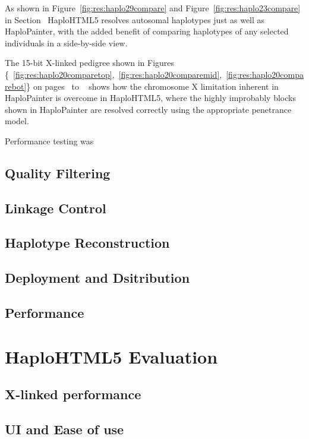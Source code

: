 As shown in Figure~\ref{fig:res:haplo29compare} and Figure~\ref{fig:res:haplo23compare} in Section~ HaploHTML5 resolves autosomal haplotypes just as well as HaploPainter, with the added benefit of comparing haplotypes of any selected individuals in a side-by-side view. 

The 15-bit X-linked pedigree shown in Figures \{~\ref{fig:res:haplo20comparetop},~\ref{fig:res:haplo20comparemid},~\ref{fig:res:haplo20comparebot}\} on pages~\pageref*{fig:res:haplo20comparetop} to ~\pageref*{fig:res:haplo20comparebot} shows how the chromosome X limitation inherent in HaploPainter is overcome in HaploHTML5, where the highly improbably blocks shown in HaploPainter are resolved correctly using the appropriate penetrance model.

Performance testing was 











\subsection{Quality Filtering}
\subsection{Linkage Control}
\subsection{Haplotype Reconstruction}
\subsection{Deployment and Dsitribution}
\subsection{Performance}


\section{HaploHTML5 Evaluation}
\subsection{X-linked performance}
\subsection{UI and Ease of use}
